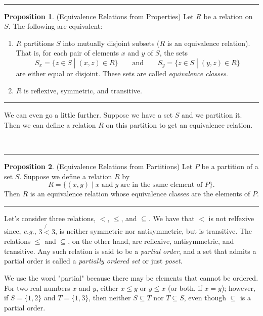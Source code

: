 \documentclass[12pt, letterpaper]{article}
\theoremstyle{definition}
\newtheorem{propt}{Proposition}
\newenvironment{prop}[1]{%
    ~\newline
    \begin{minipage}{\linewidth}
    \rule{\textwidth}{2pt}
        \begin{propt}
}
{%
        \end{propt}
    \rule{\textwidth}{2pt}
    \end{minipage}
}
\begin{document}
\begin{prop}
    \textbf{(Equivalence Relations from Properties)}
    Let $R$ be a relation on $S$. The following are equivalent:
    \begin{enumerate}[label=\textbf{\alph*.}]
        \item $R$ partitions $S$ into mutually disjoint subsets
              ($R$ is an equivalence relation). That is, for each
              pair of elements $x$ and $y$ of $S$, the sets
              \begin{equation*}
                  S_{x} = \{ z \in S \;|\; (x,z) \in R \}
                  \qquad\text{and}\qquad
                  S_{y} = \{ z \in S \;|\; (y,z) \in R \}
              \end{equation*}
              are either equal or disjoint. These sets are called \emph{equivalence classes}.
        \item $R$ is reflexive, symmetric, and transitive.
    \end{enumerate}
\end{prop}

\vspace*{0.1in}\noindent
We can even go a little further. Suppose we have a set $S$ and we partition
it. Then we can define a relation $R$ on this partition to get an equivalence
relation.

\begin{prop}
    \textbf{(Equivalence Relations from Partitions)}
    Let $P$ be a partition of a set $S$. Suppose we define a relation $R$ by
    \begin{equation*}
        R = \{ (x,y) \;|\; x \;\text{and}\; y \;\text{are in the same element of $P$} \}.
    \end{equation*}
    Then $R$ is an equivalence relation whose equivalence classes are the
    elements of $P$.
\end{prop}

\clearpage\pagebreak\noindent
Let's consider three relations, $<$, $\leq$, and $\subseteq$. We have that $<$
is not relfexive since, \emph{e.g.}, $3 \not{<} 3$, is neither symmetric nor
antisymmetric, but is transitive. The relations $\leq$ and $\subseteq$, on the
other hand, are reflexive, antisymmetric, and transitive. Any such relation is
said to be a \emph{partial order}, and a set that admits a partial order is
called a \emph{partially ordered set} or just \emph{poset}.

We use the word "partial" because there may be elements that cannot be ordered.
For two real numbers $x$ and $y$, either $x \leq y$ or $y \leq x$ (or both, if $x=y$);
however, if $S = \{ 1, 2 \}$ and $T = \{ 1, 3 \}$, then neither $S \subseteq T$
nor $T \subseteq S$, even though $\subseteq$ is a partial order.
\end{document}
